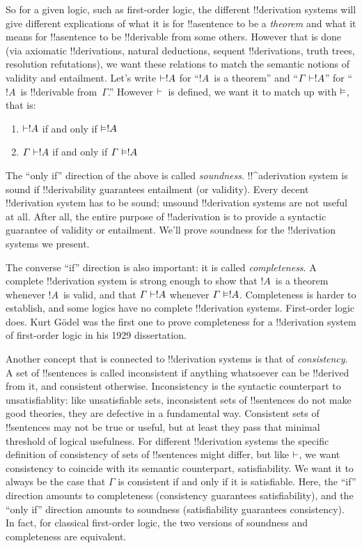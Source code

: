 \documentclass[../../../include/open-logic-section]{subfiles}
\begin{document}
So for a given logic, such as first-order logic, the different
!!{derivation} systems will give different explications of what it is
for !!a{sentence} to be a \emph{theorem} and what it means for
!!a{sentence} to be !!{derivable} from some others. However that is
done (via axiomatic !!{derivation}s, natural deductions, sequent
!!{derivation}s, truth trees, resolution refutations), we want these
relations to match the semantic notions of validity and
entailment. Let's write $\Proves !A$ for ``$!A$~is a theorem'' and
``$\Gamma \Proves !A$'' for ``$!A$~is !!{derivable} from~$\Gamma$.''
However $\Proves$~is defined, we want it to match up with $\Entails$,
that is:
\begin{enumerate}
\item $\Proves !A$ if and only if $\Entails !A$
\item $\Gamma \Proves !A$ if and only if $\Gamma \Entails !A$
\end{enumerate}
The ``only if'' direction of the above is called
\emph{soundness}. !!^a{derivation} system is sound if !!{derivability}
guarantees entailment (or validity). Every decent !!{derivation}
system has to be sound; unsound !!{derivation} systems are not useful
at all. After all, the entire purpose of !!a{derivation} is to provide
a syntactic guarantee of validity or entailment. We'll prove soundness
for the !!{derivation} systems we present.

The converse ``if'' direction is also important: it is called
\emph{completeness}. A complete !!{derivation} system is strong enough
to show that $!A$~is a theorem whenever $!A$~is valid, and that
$\Gamma \Proves !A$ whenever $\Gamma \Entails !A$.
Completeness is harder to establish, and some logics have no complete
!!{derivation} systems. First-order logic does. Kurt G\"odel was the
first one to prove completeness for a !!{derivation} system of
first-order logic in his 1929 dissertation.

Another concept that is connected to !!{derivation} systems is that of
\emph{consistency}. A set of !!{sentence}s is called inconsistent if
anything whatsoever can be !!{derive}d from it, and consistent
otherwise.  Inconsistency is the syntactic counterpart to
unsatisfiablity: like unsatisfiable sets, inconsistent sets of
!!{sentence}s do not make good theories, they are defective in a
fundamental way. Consistent sets of !!{sentence}s may not be true or
useful, but at least they pass that minimal threshold of logical
usefulness.  For different !!{derivation} systems the specific
definition of consistency of sets of !!{sentence}s might differ, but
like $\Proves$, we want consistency to coincide with its semantic
counterpart, satisfiability. We want it to always be the case that
$\Gamma$ is consistent if and only if it is satisfiable. Here, the
``if'' direction amounts to completeness (consistency guarantees
satisfiability), and the ``only if'' direction amounts to soundness
(satisfiability guarantees consistency).  In fact, for classical
first-order logic, the two versions of soundness and completeness are
equivalent.
\end{document}
